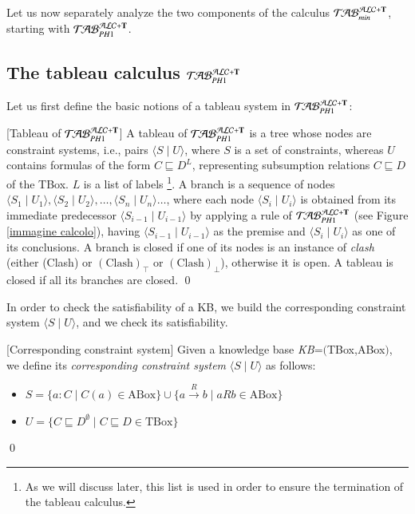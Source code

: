 \documentclass[a4paper, 11pt, oneside]{elsarticle}
\newcommand{\tip}{{\bf T}}
\newcommand{\unione} {\cup}
\newcommand{\vuoto} {\emptyset}
\newcommand{\tc} {\mid}
\newcommand{\sx} {\langle}
\newcommand{\dx} {\rangle}
\newcommand{\nuovoc}{\mathrel{{\mathcal{T}\!\mathcal{AB}}}_{min}^{\mathcal{ALC}+\mbox{\scriptsize $\tip$}}}
\newcommand{\primo}{\mathrel{{\mathcal{T}\!\mathcal{AB}}}_{PH 1}^{\mathcal{ALC}+\mbox{\scriptsize $\tip$}}}
\newcommand{\trans}[1]{\stackrel{#1}{\longrightarrow}}
\newenvironment{definition}
{\begin{defi} \rm}{\qed \end{defi}}
\newcounter{posu}
\newtheorem{definition}[posu]{Definition}
\begin{document}
Let us now separately analyze the two components of the calculus $\nuovoc$, starting with $\primo$.

\subsection{The tableau calculus $\primo$}

Let us first define the basic notions of a tableau system in $\primo$:


\begin{definition}[Tableau of $\primo$]\label{deftableau}
A tableau of $\primo$ is a tree whose nodes are constraint systems, i.e., pairs $\sx S \tc U \dx$, where $S$ is a set of constraints, whereas $U$ contains formulas of the form $C \sqsubseteq D^L$, representing subsumption relations $C \sqsubseteq D$ of the TBox.
$L$ is a list of labels
\footnote{As we will discuss later, this list is used in order to ensure the termination of the tableau calculus.}.
A branch is a sequence of nodes $\sx S_1 \tc U_1 \dx, \sx S_2 \tc U_2 \dx, \dots, \sx S_n  \tc U_n \dx \dots$, where each node $\sx S_i \tc U_i \dx$ is obtained from its immediate predecessor $\sx S_{i-1} \tc U_{i-1} \dx$ by applying a rule of $\primo$ (see Figure \ref{immagine calcolo}), having $\sx S_{i-1} \tc U_{i-1} \dx$ as the premise and $\sx S_{i} \tc U_{i} \dx$ as one of its conclusions.
A branch is closed if one of its nodes is an instance of \emph{clash} (either (Clash) or $(\mbox{Clash})_\top$ or $(\mbox{Clash})_\bot$), otherwise it is open.
A tableau is closed if all its branches are closed.
\end{definition}

\noindent In order to check the satisfiability of a KB, we build the corresponding constraint system $\sx S \tc U \dx$, and we check its satisfiability.

\begin{definition}[Corresponding constraint system]\label{corresponding constraint system}
Given a knowledge base \emph{KB}=$($TBox,ABox$)$, we define its \emph{corresponding constraint system} $\sx S \tc U \dx$ as follows:

\begin{itemize}
 \item $S=\{a: C \tc C(a) \in \mbox{ABox}\} \unione \{a \trans{R} b \tc a R b \in \mbox{ABox}\}$
 \item $U=\{C \sqsubseteq D^{\vuoto} \tc C \sqsubseteq D \in \mbox{TBox}\}$
\end{itemize}

\end{definition}
\end{document}
